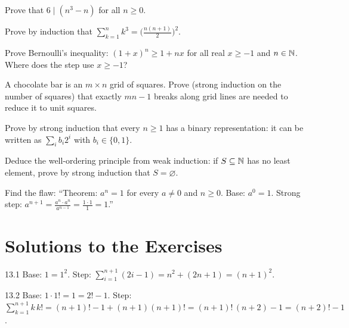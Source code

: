 \begin{exercise}{\medium}
Prove that $6 \mid (n^{3} - n)$ for all $n \geq 0$.
\end{exercise}

\begin{exercise}{\medium}
Prove by induction that $\sum_{k=1}^{n} k^3 =
\bigl(\frac{n(n+1)}{2}\bigr)^2$.
\end{exercise}

\begin{exercise}{\medium}
Prove Bernoulli's inequality: $(1 + x)^{n} \geq 1 + nx$ for all real
$x \geq -1$ and $n \in \mathbb{N}$. Where does the step use $x \geq -1$?
\end{exercise}

\begin{exercise}{\medium}
A chocolate bar is an $m \times n$ grid of squares. Prove (strong induction
on the number of squares) that exactly $mn - 1$ breaks along grid lines are
needed to reduce it to unit squares.
\end{exercise}

\begin{exercise}{\hard}
Prove by strong induction that every $n \geq 1$ has a binary representation:
it can be written as $\sum_{i} b_i 2^{i}$ with $b_i \in \{0,1\}$.
\end{exercise}

\begin{exercise}{\hard}
Deduce the well-ordering principle from weak induction: if
$S \subseteq \mathbb{N}$ has no least element, prove by strong induction that
$S = \varnothing$.
\end{exercise}

\begin{exercise}{\hard}
Find the flaw: ``Theorem: $a^{n} = 1$ for every $a \neq 0$ and $n \geq 0$.
Base: $a^0 = 1$. Strong step:
$a^{n+1} = \frac{a^{n} \cdot a^{n}}{a^{n-1}} = \frac{1 \cdot 1}{1} = 1$.''
\end{exercise}

\section*{Solutions to the Exercises}

\begin{solution}{13.1}
Base: $1 = 1^2$. Step: $\sum_{i=1}^{n+1}(2i-1) = n^2 + (2n+1) = (n+1)^2$.
\end{solution}

\begin{solution}{13.2}
Base: $1 \cdot 1! = 1 = 2! - 1$. Step:
$\sum_{k=1}^{n+1} k\,k! = (n+1)! - 1 + (n+1)(n+1)!
= (n+1)!\,(n+2) - 1 = (n+2)! - 1$.
\end{solution}

